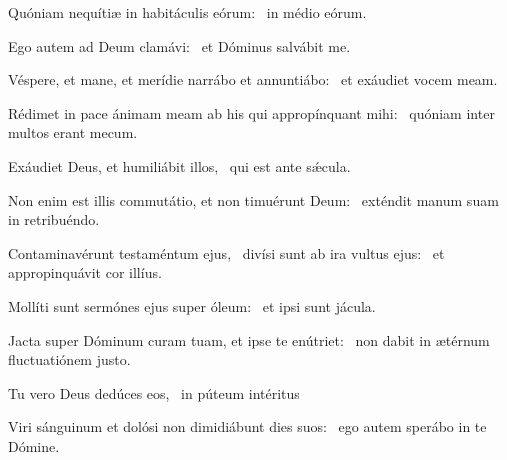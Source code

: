 \item Quóniam nequítiæ in habitáculis eórum:~\psstar{} in médio eórum.

\item Ego autem ad Deum clamávi:~\psstar{} et Dóminus salvábit me.

\item Véspere, et mane, et merídie narrábo et annuntiábo:~\psstar{} et exáudiet vocem meam.

\item Rédimet in pace ánimam meam ab his qui appropínquant mihi:~\psstar{} quóniam inter multos erant mecum.

\item Exáudiet Deus, et humiliábit illos,~\psstar{} qui est ante sǽcula.

\item Non enim est illis commutátio, et non timuérunt Deum:~\psstar{} exténdit manum suam in retribuéndo.

\item Contaminavérunt testaméntum ejus,~\pscross{} divísi sunt ab ira vultus ejus:~\psstar{} et appropinquávit cor illíus.

\item Mollíti sunt sermónes ejus super óleum:~\psstar{} et ipsi sunt jácula.

\item Jacta super Dóminum curam tuam, et ipse te enútriet:~\psstar{} non dabit in ætérnum fluctuatiónem justo.

\item Tu vero Deus dedúces eos,~\psstar{} in púteum intéritus

\item Viri sánguinum et dolósi non dimidiábunt dies suos:~\psstar{} ego autem sperábo in te Dómine.
